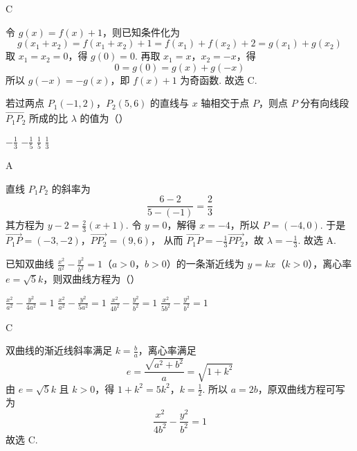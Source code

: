\begin{answer}
C
\end{answer}

\begin{solution}
令 \(g(x)=f(x)+1\)，则已知条件化为
\[
g(x_{1}+x_{2})=f(x_{1}+x_{2})+1=f(x_{1})+f(x_{2})+2=g(x_{1})+g(x_{2})
\]
取 \(x_{1}=x_{2}=0\)，得 \(g(0)=0\). 再取 \(x_{1}=x\)，\(x_{2}=-x\)，得
\[
0=g(0)=g(x)+g(-x)
\]
所以 \(g(-x)=-g(x)\)，即 \(f(x)+1\) 为奇函数. 故选 C.
\end{solution}

\begin{problem}
若过两点 \(P_{1}(-1,2)\)，\(P_{2}(5,6)\) 的直线与 \(x\) 轴相交于点 \(P\)，则点 \(P\) 分有向线段 \(\overrightarrow{P_1P_2}\) 所成的比 \(\lambda\) 的值为（\quad）

\choices
    {\(-\frac{1}{3}\)}
    {\(-\frac{1}{5}\)}
    {\(\frac{1}{5}\)}
    {\(\frac{1}{3}\)}
\end{problem}

\begin{answer}
A
\end{answer}

\begin{solution}
直线 \(P_{1}P_{2}\) 的斜率为
\[
\frac{6-2}{5-(-1)}=\frac{2}{3}
\]
其方程为 \(y-2=\frac{2}{3}(x+1)\). 令 \(y=0\)，解得 \(x=-4\)，所以 \(P=(-4,0)\). 于是
\(\overrightarrow{P_{1}P}=(-3,-2)\)，\(\overrightarrow{PP_{2}}=(9,6)\)，
从而 \(\overrightarrow{P_{1}P}=-\frac{1}{3}\overrightarrow{PP_{2}}\)，故 \(\lambda=-\frac{1}{3}\). 故选 A.
\end{solution}

\begin{problem}
已知双曲线 \(\frac{x^2}{a^2} - \frac{y^2}{b^2} = 1\)（\(a > 0\)，\(b > 0\)）的一条渐近线为 \(y = kx\)（\(k > 0\)），离心率 \(e = \sqrt{5} k\)，则双曲线方程为（\quad）

\choices
    {\(\frac{x^2}{a^2} - \frac{y^2}{4a^2} = 1\)}
    {\(\frac{x^2}{a^2} - \frac{y^2}{5a^2} = 1\)}
    {\(\frac{x^2}{4b^2} - \frac{y^2}{b^2} = 1\)}
    {\(\frac{x^2}{5b^2} - \frac{y^2}{b^2} = 1\)}
\end{problem}

\begin{answer}
C
\end{answer}

\begin{solution}
双曲线的渐近线斜率满足 \(k=\frac{b}{a}\)，离心率满足
\[
e=\frac{\sqrt{a^{2}+b^{2}}}{a}=\sqrt{1+k^{2}}
\]
由 \(e=\sqrt{5}k\) 且 \(k>0\)，得
\(1+k^{2}=5k^{2}\)，\(k=\frac{1}{2}\).
所以 \(a=2b\)，原双曲线方程可写为
\[
\frac{x^{2}}{4b^{2}}-\frac{y^{2}}{b^{2}}=1
\]
故选 C.
\end{solution}

